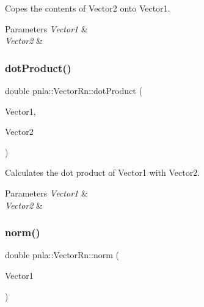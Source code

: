 Copes the contents of \textquotesingle{}Vector2\textquotesingle{} onto \textquotesingle{}Vector1\textquotesingle{}. 


\begin{DoxyParams}{Parameters}
{\em Vector1} & \\
\hline
{\em Vector2} & \\
\hline
\end{DoxyParams}
\mbox{\label{classpnla_1_1VectorRn_a70c593f6a54a97cbdcab7bad1da3b6f0}} 
\subsubsection{\texorpdfstring{dot\+Product()}{dotProduct()}}
{\footnotesize\ttfamily double pnla\+::\+Vector\+Rn\+::dot\+Product (\begin{DoxyParamCaption}\item[{const \mbox{\hyperlink{classpnla_1_1VectorRn}{Vector\+Rn}}}]{Vector1,  }\item[{const \mbox{\hyperlink{classpnla_1_1VectorRn}{Vector\+Rn}}}]{Vector2 }\end{DoxyParamCaption})\hspace{0.3cm}{\ttfamily [inline]}}



Calculates the dot product of \textquotesingle{}Vector1\textquotesingle{} with \textquotesingle{}Vector2\textquotesingle{}. 


\begin{DoxyParams}{Parameters}
{\em Vector1} & \\
\hline
{\em Vector2} & \\
\hline
\end{DoxyParams}
\mbox{\label{classpnla_1_1VectorRn_a7774eecc9a019112934833d2e63b3fa5}} 
\subsubsection{\texorpdfstring{norm()}{norm()}}
{\footnotesize\ttfamily double pnla\+::\+Vector\+Rn\+::norm (\begin{DoxyParamCaption}\item[{const \mbox{\hyperlink{classpnla_1_1VectorRn}{Vector\+Rn}}}]{Vector1 }\end{DoxyParamCaption})\hspace{0.3cm}{\ttfamily [inline]}}




